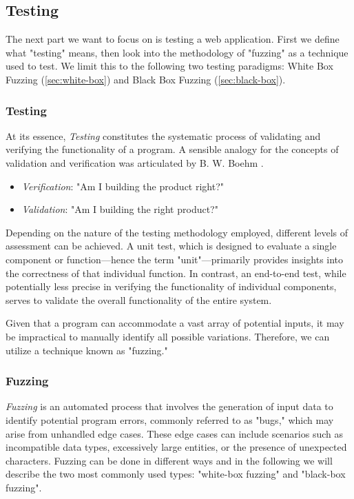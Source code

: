 \subsection{Testing}
\label{sec:testing}

The next part we want to focus on is testing a web application. First we define what "testing" means, then look into the methodology of "fuzzing" as a technique used to test. We limit this to the following two testing paradigms: White Box Fuzzing (\autoref{sec:white-box}) and Black Box Fuzzing (\autoref{sec:black-box}).

\subsubsection{Testing}
At its essence, \textit{Testing} constitutes the systematic process of validating and verifying the functionality of a program. A sensible analogy for the concepts of validation and verification was articulated by B. W. Boehm \citet{b_w_boehm_verifying_1984}. 

\begin{itemize}[label={}]
    \item \textit{Verification}: "Am I building the product right?" 
    \item \textit{Validation}: "Am I building the right product?"
\end{itemize}
Depending on the nature of the testing methodology employed, different levels of assessment can be achieved. A unit test, which is designed to evaluate a single component or function—hence the term "unit"—primarily provides insights into the correctness of that individual function. In contrast, an end-to-end test, while potentially less precise in verifying the functionality of individual components, serves to validate the overall functionality of the entire system. 

Given that a program can accommodate a vast array of potential inputs, it may be impractical to manually identify all possible variations. Therefore, we can utilize a technique known as "fuzzing."

\subsubsection{Fuzzing}
\label{sec:fuzzing}
\textit{Fuzzing} is an automated process that involves the generation of input data to identify potential program errors, commonly referred to as "bugs," which may arise from unhandled edge cases. These edge cases can include scenarios such as incompatible data types, excessively large entities, or the presence of unexpected characters.
Fuzzing can be done in different ways and in the following we will describe the two most commonly used types: "white-box fuzzing" and "black-box fuzzing".


